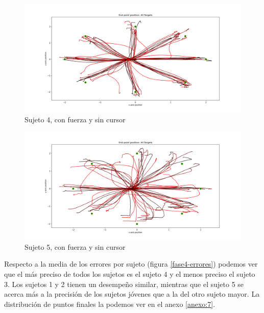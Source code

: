 \documentclass[a4paper,11pt, oneside]{book}
\begin{document}
\begin{figure}[H]
	\includegraphics[width=\linewidth]{sujeto4/force_no_cursor/trayectorias}
	\caption{Sujeto 4, con  fuerza y sin cursor}
	\label{4-4-0}
\end{figure}
\begin{figure}[H]
	\includegraphics[width=\linewidth]{sujeto5/force_no_cursor/trayectorias}
	\caption{Sujeto 5, con  fuerza y sin cursor}
	\label{5-4-0}
\end{figure}

Respecto a la media de los errores por sujeto (figura \ref{fase4-errores}) podemos ver que el más preciso de todos los sujetos es el sujeto 4 y el menos preciso el sujeto 3. Los sujetos 1 y 2 tienen un desempeño similar, mientras que el sujeto 5 se acerca más a la precisión de los sujetos jóvenes que a la del otro sujeto mayor. La distribución de puntos finales la podemos ver en el anexo \ref{anexo:7}.
\end{document}
